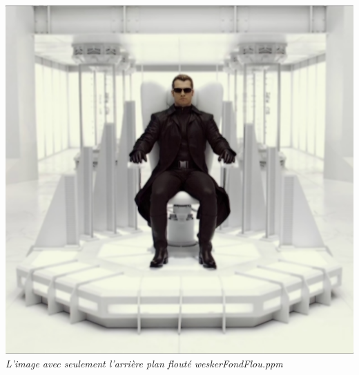 \documentclass[a4paper,11pt]{article}
\begin{document}
\begin{center}
\includegraphics[scale=0.7]{weskerfondflou.png}\\
\textit{L'image avec seulement l'arrière plan flouté weskerFondFlou.ppm}
\end{center}

\newpage
\end{document}
